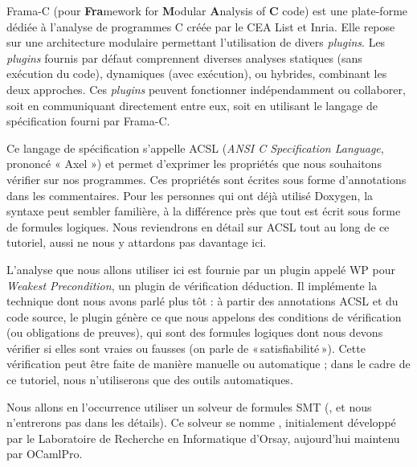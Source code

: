 





Frama-C (pour \textbf{Fra}mework for \textbf{M}odular \textbf{A}nalysis of
\textbf{C} code) est une plate-forme dédiée à l'analyse de programmes C créée
par le CEA List et Inria. Elle
repose sur une architecture modulaire permettant l'utilisation de divers
\textit{plugins}. Les \textit{plugins} fournis par défaut comprennent diverses
analyses statiques (sans exécution du code), dynamiques (avec exécution), ou
hybrides, combinant les deux approches. Ces \textit{plugins} peuvent fonctionner
indépendamment ou collaborer, soit en communiquant directement entre eux, soit
en utilisant le langage de spécification fourni par Frama-C.




Ce langage de spécification s'appelle ACSL (\textit{ANSI C Specification Language},
prononcé « Axel ») et permet d'exprimer les propriétés que nous souhaitons
vérifier sur nos programmes. Ces propriétés sont écrites sous forme d'annotations
dans les commentaires. Pour les personnes qui ont déjà utilisé Doxygen, la syntaxe
peut sembler familière, à la différence près que tout est écrit sous forme de
formules logiques. Nous reviendrons en détail sur ACSL tout au long de ce tutoriel,
aussi ne nous y attardons pas davantage ici.



L'analyse que nous allons utiliser ici est fournie par un plugin appelé WP pour
\textit{Weakest Precondition}, un plugin de vérification déduction. Il implémente
la technique dont nous avons parlé plus tôt :
à partir des annotations ACSL et du code source, le plugin génère ce que nous
appelons des conditions de vérification (ou obligations de preuves), qui sont
des formules logiques dont nous devons vérifier si elles sont vraies ou fausses
(on parle de « satisfiabilité »). Cette vérification peut être faite de manière
manuelle ou automatique ; dans le cadre de ce tutoriel, nous n'utiliserons que
des outils automatiques.



Nous allons en l'occurrence utiliser un solveur de formules SMT
(,
et nous n'entrerons pas dans les détails). Ce solveur se nomme
, initialement développé par le Laboratoire
de Recherche en Informatique d'Orsay, aujourd'hui maintenu par
OCamlPro.



